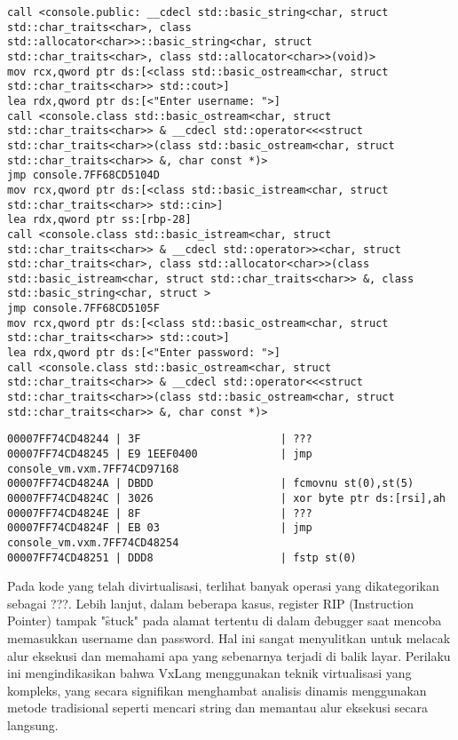 \begin{verbatim}
call <console.public: __cdecl std::basic_string<char, struct std::char_traits<char>, class std::allocator<char>>::basic_string<char, struct std::char_traits<char>, class std::allocator<char>>(void)>
mov rcx,qword ptr ds:[<class std::basic_ostream<char, struct std::char_traits<char>> std::cout>]
lea rdx,qword ptr ds:[<"Enter username: ">]
call <console.class std::basic_ostream<char, struct std::char_traits<char>> & __cdecl std::operator<<<struct std::char_traits<char>>(class std::basic_ostream<char, struct std::char_traits<char>> &, char const *)>
jmp console.7FF68CD5104D
mov rcx,qword ptr ds:[<class std::basic_istream<char, struct std::char_traits<char>> std::cin>]
lea rdx,qword ptr ss:[rbp-28]
call <console.class std::basic_istream<char, struct std::char_traits<char>> & __cdecl std::operator>><char, struct std::char_traits<char>, class std::allocator<char>>(class std::basic_istream<char, struct std::char_traits<char>> &, class std::basic_string<char, struct >
jmp console.7FF68CD5105F
mov rcx,qword ptr ds:[<class std::basic_ostream<char, struct std::char_traits<char>> std::cout>]
lea rdx,qword ptr ds:[<"Enter password: ">]
call <console.class std::basic_ostream<char, struct std::char_traits<char>> & __cdecl std::operator<<<struct std::char_traits<char>>(class std::basic_ostream<char, struct std::char_traits<char>> &, char const *)>
\end{verbatim}

\begin{verbatim}
00007FF74CD48244 | 3F                      | ???
00007FF74CD48245 | E9 1EEF0400             | jmp console_vm.vxm.7FF74CD97168
00007FF74CD4824A | DBDD                    | fcmovnu st(0),st(5)
00007FF74CD4824C | 3026                    | xor byte ptr ds:[rsi],ah
00007FF74CD4824E | 8F                      | ???
00007FF74CD4824F | EB 03                   | jmp console_vm.vxm.7FF74CD48254
00007FF74CD48251 | DDD8                    | fstp st(0)
\end{verbatim}

Pada kode yang telah divirtualisasi, terlihat banyak operasi yang dikategorikan sebagai ???. Lebih lanjut, dalam beberapa kasus, register RIP (\f{Instruction Pointer}) tampak "\f{stuck}" pada alamat tertentu di dalam \f{debugger} saat mencoba memasukkan username dan password. Hal ini sangat menyulitkan untuk melacak alur eksekusi dan memahami apa yang sebenarnya terjadi di balik layar. Perilaku ini mengindikasikan bahwa VxLang menggunakan teknik virtualisasi yang kompleks, yang secara signifikan menghambat analisis dinamis menggunakan metode tradisional seperti mencari string dan memantau alur eksekusi secara langsung.

